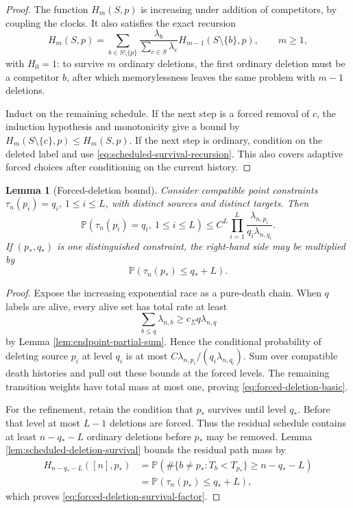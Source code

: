 \documentclass[11pt]{article}
\newtheorem{lemma}[theorem]{Lemma}
\theoremstyle{remark}
\newcommand{\Pp}{\mathbb P}
\begin{document}
\begin{proof}
The function $H_m(S,p)$ is increasing under addition of competitors, by
coupling the clocks.  It also satisfies the exact recursion
\[
        H_m(S,p)=
        \sum_{b\in S\setminus\{p\}}
        \frac{\lambda_b}{\sum_{c\in S}\lambda_c}
        H_{m-1}(S\setminus\{b\},p),
        \qquad m\ge1,
\tag{10.36}\label{eq:scheduled-survival-recursion}
\]
with $H_0=1$: to survive $m$ ordinary deletions, the first ordinary deletion
must be a competitor $b$, after which memorylessness leaves the same problem
with $m-1$ deletions.

Induct on the remaining schedule.  If the next step is a forced removal of
$c$, the induction hypothesis and monotonicity give a bound by
$H_m(S\setminus\{c\},p)\le H_m(S,p)$.  If the next step is ordinary, condition
on the deleted label and use \eqref{eq:scheduled-survival-recursion}.  This
also covers adaptive forced choices after conditioning on the current history.
\end{proof}

\begin{lemma}[Forced-deletion bound]
\label{lem:forced-deletion}
Consider compatible point constraints
$\tau_n(p_i)=q_i$, $1\le i\le L$, with distinct sources and distinct targets.
Then
\[
        \Pp(\tau_n(p_i)=q_i,\ 1\le i\le L)
        \le C^L\prod_{i=1}^L
        \frac{\lambda_{n,p_i}}{q_i\lambda_{n,q_i}}.
\tag{10.37}\label{eq:forced-deletion-basic}
\]
If $(p_*,q_*)$ is one distinguished constraint, the right-hand side may be
multiplied by
\[
        \Pp(\tau_n(p_*)\le q_*+L).
\tag{10.38}\label{eq:forced-deletion-survival-factor}
\]
\end{lemma}

\begin{proof}
Expose the increasing exponential race as a pure-death chain.  When $q$ labels
are alive, every alive set has total rate at least
\[
        \sum_{b\le q}\lambda_{n,b}
        \ge c_\Sigma q\lambda_{n,q}
\]
by Lemma \ref{lem:endpoint-partial-sum}.  Hence the conditional probability of
deleting source $p_i$ at level $q_i$ is at most
$C\lambda_{n,p_i}/(q_i\lambda_{n,q_i})$.  Sum over compatible death histories
and pull out these bounds at the forced levels.  The remaining transition
weights have total mass at most one, proving
\eqref{eq:forced-deletion-basic}.

For the refinement, retain the condition that $p_*$ survives until level
$q_*$.  Before that level at most $L-1$ deletions are forced.  Thus the
residual schedule contains at least $n-q_*-L$ ordinary deletions before
$p_*$ may be removed.  Lemma \ref{lem:scheduled-deletion-survival} bounds the
residual path mass by
\[
\begin{aligned}
H_{n-q_*-L}([n],p_*)
&=\Pp\left(\#\{b\ne p_*:T_b<T_{p_*}\}
\ge n-q_*-L\right)\\
&=\Pp(\tau_n(p_*)\le q_*+L),
\end{aligned}
\]
which proves \eqref{eq:forced-deletion-survival-factor}.
\end{proof}
\end{document}
